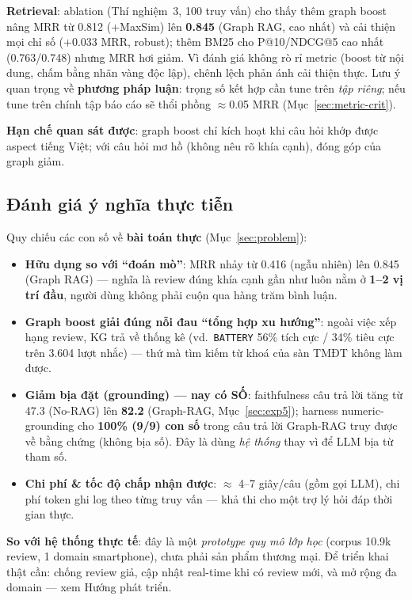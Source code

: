 \documentclass[12pt,a4paper]{article}
\begin{document}
\textbf{Retrieval}: ablation (Thí nghiệm~3, 100 truy vấn) cho thấy thêm graph boost nâng MRR từ 0.812 (+MaxSim) lên \textbf{0.845} (Graph RAG, cao nhất) và cải thiện mọi chỉ số ($+0.033$ MRR, robust); thêm BM25 cho P@10/NDCG@5 cao nhất (0.763/0.748) nhưng MRR hơi giảm. Vì đánh giá không rò rỉ metric (boost từ nội dung, chấm bằng nhãn vàng độc lập), chênh lệch phản ánh cải thiện thực. Lưu ý quan trọng về \textbf{phương pháp luận}: trọng số kết hợp cần tune trên \textit{tập riêng}; nếu tune trên chính tập báo cáo sẽ thổi phồng $\approx$0.05 MRR (Mục~\ref{sec:metric-crit}).

\textbf{Hạn chế quan sát được}: graph boost chỉ kích hoạt khi câu hỏi khớp được aspect tiếng Việt; với câu hỏi mơ hồ (không nêu rõ khía cạnh), đóng góp của graph giảm.

\subsection{Đánh giá ý nghĩa thực tiễn}

Quy chiếu các con số về \textbf{bài toán thực} (Mục~\ref{sec:problem}):

\begin{itemize}[leftmargin=1.5cm,itemsep=1pt]
  \item \textbf{Hữu dụng so với ``đoán mò''}: MRR nhảy từ 0.416 (ngẫu nhiên) lên 0.845 (Graph RAG) --- nghĩa là review đúng khía cạnh gần như luôn nằm ở \textbf{1--2 vị trí đầu}, người dùng không phải cuộn qua hàng trăm bình luận.
  \item \textbf{Graph boost giải đúng nỗi đau ``tổng hợp xu hướng''}: ngoài việc xếp hạng review, KG trả về thống kê (vd.\ \texttt{BATTERY} 56\% tích cực / 34\% tiêu cực trên 3.604 lượt nhắc) --- thứ mà tìm kiếm từ khoá của sàn TMĐT không làm được.
  \item \textbf{Giảm bịa đặt (grounding) --- nay có SỐ}: faithfulness câu trả lời tăng từ 47.3 (No-RAG) lên \textbf{82.2} (Graph-RAG, Mục~\ref{sec:exp5}); harness numeric-grounding cho \textbf{100\% (9/9) con số} trong câu trả lời Graph-RAG truy được về bằng chứng (không bịa số). Đây là dùng \textit{hệ thống} thay vì để LLM bịa từ tham số.
  \item \textbf{Chi phí \& tốc độ chấp nhận được}: $\approx$ 4--7 giây/câu (gồm gọi LLM), chi phí token ghi log theo từng truy vấn --- khả thi cho một trợ lý hỏi đáp thời gian thực.
\end{itemize}

\noindent\textbf{So với hệ thống thực tế}: đây là một \textit{prototype quy mô lớp học} (corpus 10.9k review, 1 domain smartphone), chưa phải sản phẩm thương mại. Để triển khai thật cần: chống review giả, cập nhật real-time khi có review mới, và mở rộng đa domain --- xem Hướng phát triển.
\end{document}
